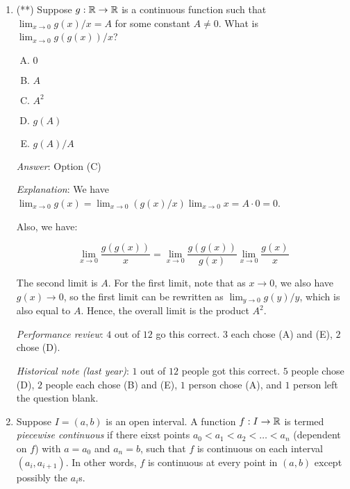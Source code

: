 \documentclass[10pt]{amsart}
\begin{document}
\begin{enumerate}
  Option (D): The same counterexample as for option (B) works.

  {\em Performance review}: $6$ out of $12$ got this correct. $3$
  chose (C), $2$ chose (D), $1$ chose (E).

  {\em Historical note (last year)}: $2$ out of $11$ people got this
  correct. (C) was the most frequently chosen incorrect answer.

  {\em Action point}: Please review the statement of the extreme value
  theorem, as well as understand why all the other examples are
  incorrect.

\item (**) Suppose $g:\mathbb{R} \to \mathbb{R}$ is a continuous function such that
  $\lim_{x \to 0} g(x)/x = A$ for some constant $A \ne 0$. What is
  $\lim_{x \to 0} g(g(x))/x$?

  \begin{enumerate}[(A)]
  \item $0$
  \item $A$
  \item $A^2$
  \item $g(A)$
  \item $g(A)/A$
  \end{enumerate}

  {\em Answer}: Option (C)

  {\em Explanation}: We have $\lim_{x \to 0} g(x) = \lim_{x \to 0}
  (g(x)/x) \lim_{x \to 0} x = A \cdot 0 = 0$.

  Also, we have:

  $$\lim_{x \to 0} \frac{g(g(x))}{x} = \lim_{x \to 0} \frac{g(g(x))}{g(x)} \lim_{x \to 0} \frac{g(x)}{x}$$

  The second limit is $A$. For the first limit, note that as $x \to
  0$, we also have $g(x) \to 0$, so the first limit can be rewritten
  as $\lim_{y \to 0} g(y)/y$, which is also equal to $A$. Hence, the
  overall limit is the product $A^2$.

  {\em Performance review}: $4$ out of $12$ go this correct. $3$ each
  chose (A) and (E), $2$ chose (D).

  {\em Historical note (last year)}: $1$ out of $12$ people got this
  correct. $5$ people chose (D), $2$ people each chose (B) and (E),
  $1$ person chose (A), and $1$ person left the question blank.


\item Suppose $I = (a,b)$ is an open interval. A function $f:I \to \mathbb{R}$
  is termed {\em piecewise continuous} if there eixst points $a_0 <
  a_1 < a_2 < \dots < a_n$ (dependent on $f$) with $a = a_0$ and $a_n
  = b$, such that $f$ is continuous on each interval $(a_i,
  a_{i+1})$. In other words, $f$ is continuous at every point in
  $(a,b)$ except possibly the $a_i$s.


\end{enumerate}
\end{document}
